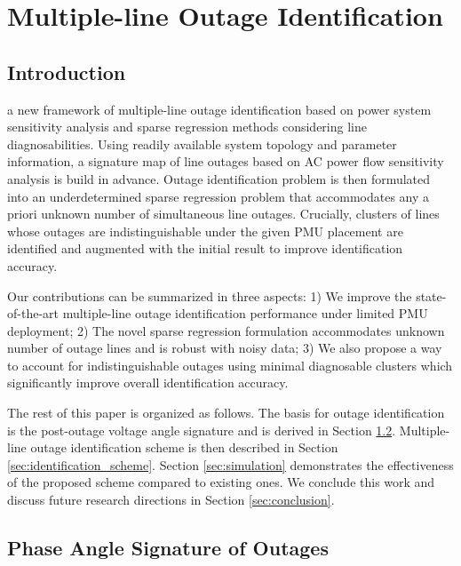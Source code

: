
\chapter{Multiple-line Outage Identification}
\label{ch:identification}
\vspace{2em}

\section{Introduction} %
\label{sec:introduction}

a new framework of multiple-line outage identification based on power system sensitivity analysis and sparse regression methods considering line diagnosabilities. Using readily available system topology and parameter information, a signature map of line outages based on AC power flow sensitivity analysis is build in advance. Outage identification problem is then formulated into an underdetermined sparse regression problem that accommodates any a priori unknown number of simultaneous line outages. Crucially, clusters of lines whose outages are indistinguishable under the given PMU placement are identified and augmented with the initial result to improve identification accuracy. 

Our contributions can be summarized in three aspects: 1) We improve the state-of-the-art multiple-line outage identification performance under limited PMU deployment; 2) The novel sparse regression formulation accommodates unknown number of outage lines and is robust with noisy data; 3)
We also propose a way to account for indistinguishable outages using minimal diagnosable clusters which significantly improve overall identification accuracy.

The rest of this paper is organized as follows. The basis for outage identification is the post-outage voltage angle signature and is derived in Section \ref{sec:angle_signature}. Multiple-line outage identification scheme is then described in Section \ref{sec:identification_scheme}. Section \ref{sec:simulation} demonstrates the effectiveness of the proposed scheme compared to existing ones. We conclude this work and discuss future research directions in Section \ref{sec:conclusion}. 


\section{Phase Angle Signature of Outages}
\label{sec:angle_signature}

